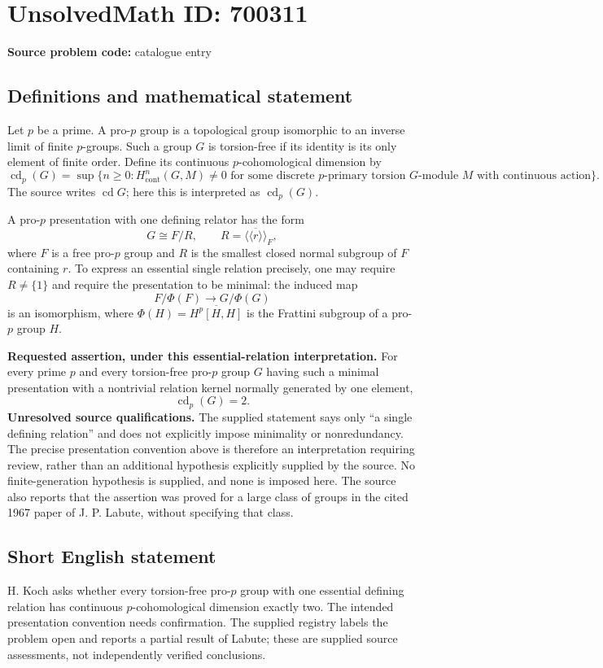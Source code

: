 \documentclass[11pt]{article}
\begin{document}
\section*{UnsolvedMath ID: 700311}
\textbf{Source problem code:} catalogue entry
\subsection{Definitions and mathematical statement}
Let \(p\) be a prime. A pro-\(p\) group is a topological group isomorphic to an inverse limit of finite \(p\)-groups. Such a group \(G\) is torsion-free if its identity is its only element of finite order. Define its continuous \(p\)-cohomological dimension by
\[
\operatorname{cd}_p(G)=\sup\bigl\{n\geq 0: H^n_{\mathrm{cont}}(G,M)\neq 0\text{ for some discrete }p\text{-primary torsion }G\text{-module }M\text{ with continuous action}\bigr\}.
\]
The source writes \(\operatorname{cd}G\); here this is interpreted as \(\operatorname{cd}_p(G)\).

A pro-\(p\) presentation with one defining relator has the form
\[
G\cong F/R,\qquad R=\overline{\langle\!\langle r\rangle\!\rangle}_F,
\]
where \(F\) is a free pro-\(p\) group and \(R\) is the smallest closed normal subgroup of \(F\) containing \(r\). To express an essential single relation precisely, one may require \(R\neq\{1\}\) and require the presentation to be minimal: the induced map
\[
F/\Phi(F)\longrightarrow G/\Phi(G)
\]
is an isomorphism, where \(\Phi(H)=\overline{H^p[H,H]}\) is the Frattini subgroup of a pro-\(p\) group \(H\).

\textbf{Requested assertion, under this essential-relation interpretation.} For every prime \(p\) and every torsion-free pro-\(p\) group \(G\) having such a minimal presentation with a nontrivial relation kernel normally generated by one element,
\[
\operatorname{cd}_p(G)=2.
\]
\textbf{Unresolved source qualifications.} The supplied statement says only ``a single defining relation'' and does not explicitly impose minimality or nonredundancy. The precise presentation convention above is therefore an interpretation requiring review, rather than an additional hypothesis explicitly supplied by the source. No finite-generation hypothesis is supplied, and none is imposed here. The source also reports that the assertion was proved for a large class of groups in the cited 1967 paper of J. P. Labute, without specifying that class.
\subsection{Short English statement}
H. Koch asks whether every torsion-free pro-\(p\) group with one essential defining relation has continuous \(p\)-cohomological dimension exactly two. The intended presentation convention needs confirmation. The supplied registry labels the problem open and reports a partial result of Labute; these are supplied source assessments, not independently verified conclusions.
\end{document}
